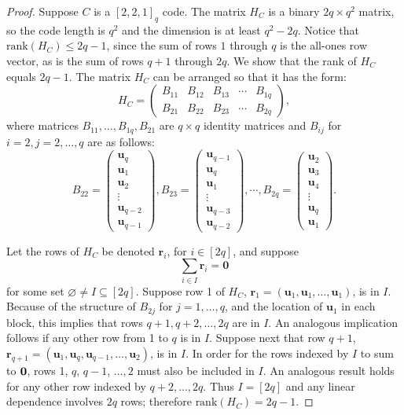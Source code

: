 \documentclass[11pt]{amsart}
\theoremstyle{definition}
\newcommand{\0}{\mathbf{0}}
\begin{document}
\begin{proof} Suppose $C$ is a $[2, 2, 1]_q$ code. 
    The matrix $H_{C}$ is a binary $2q\times q^2$ matrix, so the code length is $q^2$ and the dimension is at least $q^2-2q$. Notice that $\text{rank}(H_C)\leq 2q-1$, since the sum of rows $1$ through $q$ is the all-ones row vector, as is the sum of rows $q+1$ through $2q$. We show that the rank of $H_C$ equals $2q-1$.  The matrix $H_C$ can be arranged so that it has the form: 
    \[ H_C=\begin{pmatrix} B_{11} & B_{12} & B_{13}& \cdots & B_{1q} \\ 
                        B_{21} & B_{22} & B_{23}& \cdots & B_{2q} 
    \end{pmatrix},  \]
    where matrices $B_{11}, \ldots, B_{1q}, B_{21}$ are $q\times q$ identity matrices and $B_{ij}$ for $i=2, j=2,\ldots, q$ are as follows: 
    \[ B_{22} = \begin{pmatrix}
        \mathbf{u}_{q} \\ \mathbf{u}_1 \\ \mathbf{u}_2 \\ \vdots \\\mathbf{u}_{q-2} \\ \mathbf{u}_{q-1} 
    \end{pmatrix}, B_{23} =\begin{pmatrix}
        \mathbf{u}_{q-1} \\ \mathbf{u}_q \\ \mathbf{u}_1 \\ \vdots \\\mathbf{u}_{q-3}\\ \mathbf{u}_{q-2} 
    \end{pmatrix}, \cdots, B_{2q} = \begin{pmatrix}
        \mathbf{u}_{2} \\ \mathbf{u}_3 \\ \mathbf{u}_4 \\ \vdots \\\mathbf{u}_q\\ \mathbf{u}_{1} 
    \end{pmatrix}. \]

Let the rows of $H_C$ be denoted $\mathbf{r}_i$, for $i\in [2q]$, and suppose 
\begin{equation*}
   \sum_{i\in I} \mathbf{r}_i=\mathbf{0}\label{eq:sum-rows}
\end{equation*}
for some set $\varnothing \neq I\subseteq [2q]$.
Suppose row 1 of $H_C$, $\mathbf{r}_1=(\mathbf{u}_1, \mathbf{u}_1, \ldots, \mathbf{u}_1)$, is in $I$. Because of the structure of $B_{2j}$ for $j=1, \ldots, q$, and the location of $\mathbf{u}_1$ in each block, this implies that rows $q+1, q+2, \ldots, 2q$ are in $I$. An analogous implication follows if any other row from 1 to $q$ is in $I$. Suppose next that row $q+1$, $\mathbf{r}_{q+1}=(\mathbf{u}_1, \mathbf{u}_q, \mathbf{u}_{q-1}, \ldots, \mathbf{u}_2)$, is in $I$. In order for the rows indexed by $I$ to sum to $\bf{0}$, 
rows 1, $q$, $q-1$, 
$\ldots, 2$ must also be included in $I$. An analogous result holds for any other row indexed by $q+2, \ldots, 2q$. 
Thus $I=[2q]$ and any linear dependence involves $2q$ rows; therefore $\text{rank}(H_C)=2q-1$.  


\end{proof}
\end{document}
